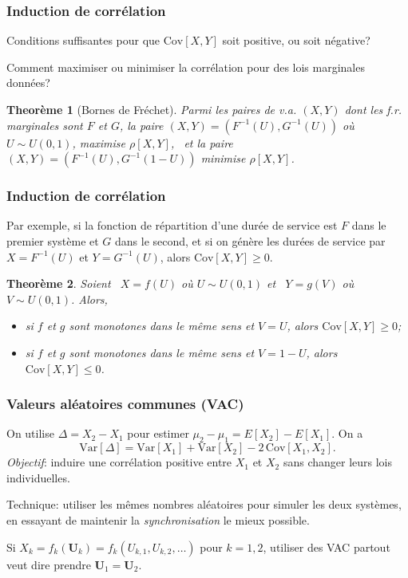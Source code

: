 \documentclass[t,usepdftitle=false]{beamer}
\def\bU{\boldsymbol{U}}
\def\Var{\mbox{Var}}
\def\Cov{\mbox{Cov}}
\newtheorem{thm}{Theorème}
\begin{document}
\begin{frame}
\frametitle{Induction de corrélation}

Conditions suffisantes pour que $\Cov[X,Y]$ 
soit positive, ou soit négative?

\mbox{}

Comment maximiser ou minimiser la corrélation pour des lois 
 marginales données?

\mbox{}

\begin{thm}[Bornes de Fréchet]
Parmi les paires de v.a.{} $(X,Y)$ dont les f.r.{} marginales sont 
${F}$ et ${G}$, la paire $(X,Y) = (F^{-1}(U), G^{-1}(U))$ 
o\`u ${U} \sim U(0,1)$, 
\emph{maximise} $\rho[X, Y]$, \
et la paire $(X,Y) = (F^{-1}(U), G^{-1}(1-U))$
\emph{minimise} $\rho[X, Y]$.
\end{thm}

\end{frame}

\begin{frame}
\frametitle{Induction de corrélation}

Par exemple, si la fonction de répartition d'une durée de service est 
${F}$ dans le premier système et ${G}$ dans le second,
et si on génère les durées de service par
$X = F^{-1}(U)$ et $Y = G^{-1}(U)$, alors $\Cov[X, Y] \ge 0$.

\begin{thm}
Soient \ ${X} = {f}(U)$ o\`u ${U} \sim U(0,1)$ et \
 ${Y} = {g}(V)$ o\`u ${V} \sim U(0,1)$. Alors,
\begin{itemize}
\item
si $f$ et $g$ sont monotones dans le m\^eme sens et $V=U$,
alors $\Cov[X, Y] \ge 0$;
\item
si $f$ et $g$ sont monotones dans le m\^eme sens et $V=1-U$,
alors $\Cov[X, Y] \le 0$.
\end{itemize}
\end{thm}

\end{frame}

\begin{frame}
\frametitle{Valeurs aléatoires communes (VAC)}

On utilise ${\Delta} = {X_2}-{X_1}$ pour estimer 
${\mu_2}-{\mu_1} = E[X_2] - E[X_1]$.  On a
\[
 \Var[\Delta] = \Var[X_1] + \Var[X_2] - 2 \, \Cov[X_1,X_2].
\]
\emph{Objectif}: induire une corrélation positive entre $X_1$ et $X_2$
sans changer leurs lois individuelles.

\mbox{}

Technique: utiliser les m\^emes nombres aléatoires pour simuler
les deux systèmes, en essayant de maintenir la \emph{synchronisation}
le mieux possible.

\mbox{}

Si $X_k = {f_k}(\bU_k) = f_k({U_{k,1}},{U_{k,2}},\dots)$ 
pour $k=1,2$, utiliser des VAC partout veut dire prendre $\bU_1=\bU_2$.

\end{frame}
\end{document}
